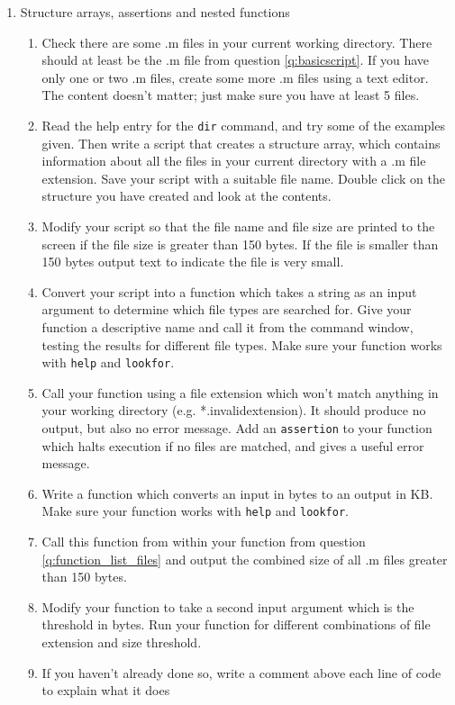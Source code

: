 \documentclass{article}
\begin{document}
	\begin{enumerate}[resume]
		\item Structure arrays, assertions and nested functions
		\begin{enumerate}
			\item Check there are some .m files in your current working directory. There should at least be the .m file from question \ref{q:basicscript}. If you have only one or two .m files, create some more .m files using a text editor. The content doesn't matter; just make sure you have at least 5 files.
			\item Read the help entry for the \texttt{dir} command, and try some of the examples given. Then write a script that creates a structure array, which contains information about all the files in your current directory with a .m file extension. Save your script with a suitable file name. Double click on the structure you have created and look at the contents.
			\item Modify your script so that the file name and file size are printed to the screen if the file size is greater than 150 bytes. If the file is smaller than 150 bytes output text to indicate the file is very small.
			\item Convert your script into a function which takes a string as an input argument to determine which file types are searched for. Give your function a descriptive name and call it from the command window, testing the results for different file types. Make sure your function works with \texttt{help} and \texttt{lookfor}.
			\item Call your function using a file extension which won't match anything in your working directory (e.g. *.invalidextension). It should produce no output, but also no error message. Add an \texttt{assertion} to your function which halts execution if no files are matched, and gives a useful error message. 
			\label{q:function_list_files}
			\item Write a function which converts an input in bytes to an output in KB. Make sure your function works with \texttt{help} and \texttt{lookfor}.
			\item Call this function from within your function from question \ref{q:function_list_files} and output the combined size of all .m files greater than 150 bytes.
			\item Modify your function to take a second input argument which is the threshold in bytes. Run your function for different combinations of file extension and size threshold.
			\item If you haven't already done so, write a comment above each line of code to explain what it does
		\end{enumerate}
	\end{enumerate}
	
\end{document}
